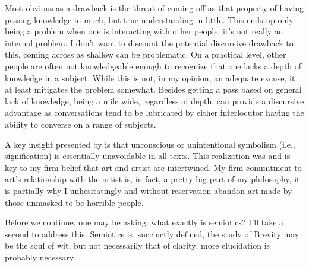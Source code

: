 \documentclass[../butidigress.tex]{subfiles}
\begin{document}
Most obvious as a drawback is the threat of coming off as  that property of having passing knowledge in much, but true understanding in little.
This ends up only being a problem when one is interacting with other people, it's not really an internal problem.
I don't want to discount the potential discursive drawback to this, coming across as shallow can be problematic.
On a practical level, other people are often not knowledgeable enough to recognize that one lacks a depth of knowledge in a subject.
While this is not, in my opinion, an adequate excuse, it at least mitigates the problem somewhat.
Besides getting a pass based on general lack of knowledge, being a mile wide, regardless of depth, can provide a discursive advantage as conversations tend to be lubricated by either interlocutor having the ability to converse on a range of subjects.

A key insight presented by  is that unconscious or unintentional symbolism (i.e., signification) is essentially unavoidable in all texts.
This realization was and is key to my firm belief that art and artist are intertwined.
My firm commitment to art's relationship with the artist is, in fact, a pretty big part of my philosophy, it is partially why I unhesitatingly and without reservation abandon art made by those unmasked to be horrible people.

Before we continue, one may be asking: what exactly is semiotics? I'll take a second to address this.
Semiotics is, succinctly defined, the study of 
Brevity may be the soul of wit, but not necessarily that of clarity; more elucidation is probably necessary.
\end{document}
